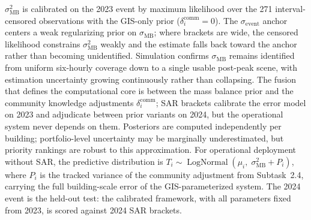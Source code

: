 \documentclass[11pt]{article}
\begin{document}
$\sigma_{\mathrm{MB}}^2$ is calibrated on the 2023 event by maximum likelihood
over the 271 interval-censored observations with the GIS-only prior
($\delta_i^{\mathrm{comm}} = 0$). The $\sigma_{\mathrm{event}}$ anchor centers a
weak regularizing prior on $\sigma_{\mathrm{MB}}$; where brackets are wide, the
censored likelihood constrains $\sigma_{\mathrm{MB}}^2$ weakly and the estimate
falls back toward the anchor rather than becoming unidentified. Simulation
confirms $\sigma_{\mathrm{MB}}$ remains identified from uniform six-hourly
coverage down to a single usable post-peak scene, with estimation uncertainty
growing continuously rather than collapsing.
The fusion that defines the computational core is between the mass balance prior
and the community knowledge adjustments $\delta_i^{\mathrm{comm}}$; SAR brackets
calibrate the error model on 2023 and adjudicate between prior variants on 2024,
but the operational system never depends on them.
Posteriors are computed independently per building; portfolio-level uncertainty
may be marginally underestimated, but priority rankings are robust to this
approximation.
For operational deployment without SAR, the predictive distribution is
$T_i \sim \operatorname{LogNormal}(\mu_i,\; \sigma_{\mathrm{MB}}^2 + P_i)$,
where $P_i$ is the tracked variance of the community adjustment from
Subtask~2.4, carrying the full building-scale error of the GIS-parameterized
system.
The 2024 event is the held-out test: the calibrated framework, with all
parameters fixed from 2023, is scored against 2024 SAR brackets.
\end{document}
